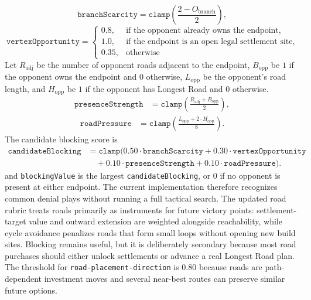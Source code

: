 \documentclass{article}
\begin{document}
\[
\texttt{branchScarcity}
= \texttt{clamp}\left(\frac{2 - O_{\text{branch}}}{2}\right),
\]
\[
\texttt{vertexOpportunity} =
\begin{cases}
0.8, & \text{if the opponent already owns the endpoint},\\
1.0, & \text{if the endpoint is an open legal settlement site},\\
0.35, & \text{otherwise}
\end{cases}
\]
Let $R_{\text{adj}}$ be the number of opponent roads adjacent to the endpoint, $B_{\text{opp}}$ be $1$ if the opponent owns the endpoint and $0$ otherwise, $L_{\text{opp}}$ be the opponent's road length, and $H_{\text{opp}}$ be $1$ if the opponent has Longest Road and $0$ otherwise.
\[
\begin{aligned}
\texttt{presenceStrength}
&= \texttt{clamp}\left(
\frac{R_{\text{adj}} + B_{\text{opp}}}{2}
\right),
\end{aligned}
\]
\[
\begin{aligned}
\texttt{roadPressure}
&= \texttt{clamp}\left(
\frac{L_{\text{opp}} + 2 \cdot H_{\text{opp}}}{8}
\right).
\end{aligned}
\]
The candidate blocking score is
\[
\begin{aligned}
\texttt{candidateBlocking}
&= \texttt{clamp}(
0.50 \cdot \texttt{branchScarcity}
+ 0.30 \cdot \texttt{vertexOpportunity} \\
&\quad + 0.10 \cdot \texttt{presenceStrength}
+ 0.10 \cdot \texttt{roadPressure}).
\end{aligned}
\]
and \texttt{blockingValue} is the largest \texttt{candidateBlocking}, or $0$ if no opponent is present at either endpoint.
The current implementation therefore recognizes common denial plays without running a full tactical search.
The updated road rubric treats roads primarily as instruments for future victory points: settlement-target value and outward extension are weighted alongside reachability, while cycle avoidance penalizes roads that form small loops without opening new build sites. Blocking remains useful, but it is deliberately secondary because most road purchases should either unlock settlements or advance a real Longest Road plan.
\\
The threshold for \texttt{road-placement-direction} is $0.80$ because roads are path-dependent investment moves and several near-best routes can preserve similar future options.
\end{document}
